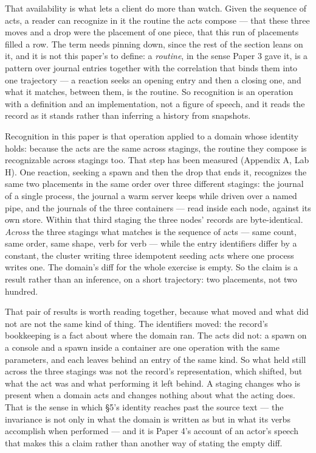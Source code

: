 \documentclass[
]{article}
\begin{document}
That availability is what lets a client do more than watch. Given the
sequence of acts, a reader can recognize in it the routine the acts
compose --- that these three moves and a drop were the placement of one
piece, that this run of placements filled a row. The term needs pinning
down, since the rest of the section leans on it, and it is not this
paper's to define: a \emph{routine}, in the sense Paper 3 gave it, is a
pattern over journal entries together with the correlation that binds
them into one trajectory --- a reaction seeks an opening entry and then
a closing one, and what it matches, between them, is the routine. So
recognition is an operation with a definition and an implementation, not
a figure of speech, and it reads the record as it stands rather than
inferring a history from snapshots.

Recognition in this paper is that operation applied to a domain whose
identity holds: because the acts are the same across stagings, the
routine they compose is recognizable across stagings too. That step has
been measured (Appendix A, Lab H). One reaction, seeking a spawn and
then the drop that ends it, recognizes the same two placements in the
same order over three different stagings: the journal of a single
process, the journal a warm server keeps while driven over a named pipe,
and the journals of the three containers --- read inside each node,
against its own store. Within that third staging the three nodes'
records are byte-identical. \emph{Across} the three stagings what
matches is the sequence of acts --- same count, same order, same shape,
verb for verb --- while the entry identifiers differ by a constant, the
cluster writing three idempotent seeding acts where one process writes
one. The domain's diff for the whole exercise is empty. So the claim is
a result rather than an inference, on a short trajectory: two
placements, not two hundred.

That pair of results is worth reading together, because what moved and
what did not are not the same kind of thing. The identifiers moved: the
record's bookkeeping is a fact about where the domain ran. The acts did
not: a spawn on a console and a spawn inside a container are one
operation with the same parameters, and each leaves behind an entry of
the same kind. So what held still across the three stagings was not the
record's representation, which shifted, but what the act was and what
performing it left behind. A staging changes who is present when a
domain acts and changes nothing about what the acting does. That is the
sense in which §5's identity reaches past the source text --- the
invariance is not only in what the domain is written as but in what its
verbs accomplish when performed --- and it is Paper 4's account of an
actor's speech that makes this a claim rather than another way of
stating the empty diff.
\end{document}
